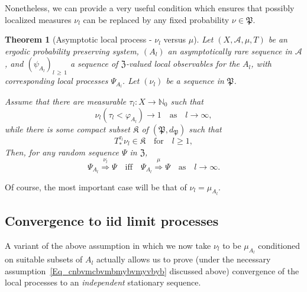 \documentclass[10pt]{amsart}
\newtheorem{theo}{Theorem}[section]
\theoremstyle{definition}\newtheorem{defi}[theo]{Definition}\newtheorem{rema}[theo]{Remark}\newtheorem{exam}[theo]{Example}\newtheorem{exem}[theo]{Example}\newtheorem{nota}[theo]{Notation}
\newcommand{\clA}{\mathcal{A}}
\newcommand{\frkK}{\mathfrak{K}}
\newcommand{\frkP}{\mathfrak{P}}
\newcommand{\frkZ}{\mathfrak{Z}}
\newcommand{\bbN}{\mathbb{N}}
\begin{document}
Nonetheless, we can provide a very useful condition which ensures that possibly localized measures $\nu_{l}$ can be replaced by any fixed probability $\nu\in\frkP$.

\begin{theo}[{Asymptotic local process - $\nu_{l}$ versus $\mu$}]\label{T_AsyIntStateProc}
Let $(X,\clA,\mu,T)$ be an ergodic probability preserving system, $(A_{l})$ an asymptotically rare sequence in $\clA$, and $(\psi_{A_{l}})_{l\,\geq\,1}$ a sequence of $\frkZ $-valued local observables for the $A_{l}$, with corresponding local processes $\Psi_{A_{l}}$. Let $(\nu_{l})$ be a sequence in $\frkP$.

Assume that there are measurable $\tau_{l}:X\rightarrow\bbN_{0}$ such that
\begin{equation}\label{Eq_hghghghgghghghghdhsf}
\nu_{l}\left(\tau_{l}<\varphi_{A_{l}}\right) \longrightarrow1\quad\text{as}\quad l\rightarrow\infty,
\end{equation}
while there is some compact subset $\frkK$ of $(\frkP,d_{\frkP})$ such that
\begin{equation}\label{Eq_cxdcdsewvxvxwfrvxsf}
T_{\ast}^{\tau_{l}}\nu_{l}\in\frkK \quad \text{for}\quad l\geq1,
\end{equation}
Then, for any random sequence $\Psi$ in $\frkZ$,
\begin{equation}
\Psi_{A_{l}}\overset{\nu_{l}}{\Longrightarrow}\Psi\quad \text{iff}\quad
\Psi_{A_{l}}\overset{\mu}{\Longrightarrow}\Psi\quad \text{as}\quad l\rightarrow
\infty.
\end{equation}
\end{theo}

Of course, the most important case will be that of $\nu_{l}=\mu_{A_{l}}$.


\subsection{Convergence to iid limit processes}
A variant of the above assumption in which we now take $\nu_{l}$ to be $\mu_{A_{l}}$ conditioned on suitable subsets of $A_{l}$ actually allows us to prove (under the necessary assumption~\eqref{Eq_cnbvmcbvmbmybvmyvbyb} discussed above) convergence of the local processes to an \emph{independent} stationary sequence.
\end{document}
